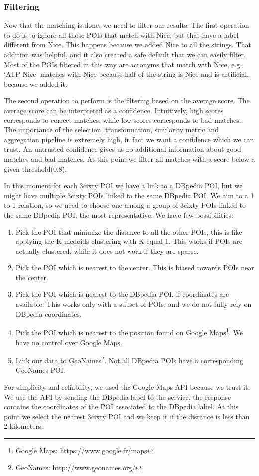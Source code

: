 \documentclass[paper=a4, fontsize=11pt]{scrartcl}
\begin{document}
\subsubsection{Filtering}
Now that the matching is done, we need to filter our results.
The first operation to do is to ignore all those POIs that match with Nice, but that have a label different from Nice. This happens because we added Nice to all the strings. That addition was helpful, and it also created a safe default that we can easily filter.
Most of the POIs filtered in this way are acronyms that match with Nice, e.g. `ATP Nice' matches with Nice because half of the string is Nice and is artificial, because we added it.

The second operation to perform is the filtering based on the average score.
The average score can be interpreted as a confidence. Intuitively, high scores corresponds to correct matches, while low scores corresponds to bad matches.
The importance of the selection, transformation, similarity metric and aggregation pipeline is extremely high, in fact we want a confidence which we can trust. An untrusted confidence gives us no additional information about good matches and bad matches.
At this point we filter all matches with a score below a given threshold(0.8).

In this moment for each 3cixty POI we have a link to a DBpedia POI, but we might have multiple 3cixty POIs linked to the same DBpedia POI. We aim to a 1 to 1 relation, so we need to choose one among a group of 3cixty POIs linked to the same DBpedia POI, the most representative.
We have few possibilities:
\begin{enumerate}
\item Pick the POI that minimize the distance to all the other POIs, this is like applying the K-medoids clustering with K equal 1. This works if POIs are actually clustered, while it does not work if they are sparse.
\item Pick the POI which is nearest to the center. This is biased towards POIs near the center.
\item Pick the POI which is nearest to the DBpedia POI, if coordinates are available. This works only with a subset of POIs, and we do not fully rely on DBpedia coordinates.
\item Pick the POI which is nearest to the position found on Google Maps\footnote{Google Maps: https://www.google.fr/maps}. We have no control over Google Maps.
\item Link our data to GeoNames\footnote{GeoNames: http://www.geonames.org/}. Not all DBpedia POIs have a corresponding GeoNames POI.
\end{enumerate}
For simplicity and reliability, we used the Google Maps API because we trust it.
We use the API by sending the DBpedia label to the service, the response contains the coordinates of the POI associated to the DBpedia label. At this point we select the nearest 3cixty POI and we keep it if the distance is less than 2 kilometers.
\end{document}
